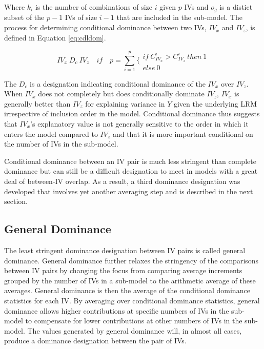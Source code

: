 \documentclass[ShortAfour,times,sageapa]{sagej}
\begin{document}
	Where $k_i$ is the number of combinations of size $i$ given $p$ IVs and $o_g$ is a distict subset of the $p-1$ IVs of size $i - 1$ that are included in the sub-model.	
	The process for determining conditional dominance between two IVs, $IV_x$ and $IV_z$, is defined in Equation \ref{eq:cdldom}.
	
	\begin{equation}
		IV_x \ D_c \ IV_z \quad if \quad p = \sum^p_{i=1} \Biggl\{ \begin{matrix} if \ C^{i}_{IV_x} > C^{i}_{IV_z} \ then \ 1 \\ else \ 0 \end{matrix}
		\label{eq:cdldom}
	\end{equation}
	
	The $D_c$ is a designation indicating conditional dominance of the $IV_x$ over $IV_z$.	
	When $IV_x$ does not completely but does conditionally dominate $IV_z$, $IV_x$ is generally better than $IV_z$ for explaining variance in $Y$ given the underlying LRM irrespective of inclusion order in the model.
	Conditional dominance thus suggests that $IV_x$'s explanatory value is not generally sensitive to the order in which it enters the model compared to $IV_z$ and that it is more important conditional on the number of IVs in the sub-model.
	
	Conditional dominance between an IV pair is much less stringent than complete dominance but can still be a difficult designation to meet in models with a great deal of between-IV overlap.
	As a result, a third dominance designation was developed that involves yet another averaging step and is described in the next section.
	
	\subsection{General Dominance}
	
	The least stringent dominance designation between IV pairs is called general dominance.
	General dominance further relaxes the stringency of the comparisons between IV pairs by changing the focus from comparing average increments grouped by the number of IVs in a sub-model to the arithmetic average of these averages.
	General dominance is then the average of the conditional dominance statistics for each IV.
	By averaging over conditional dominance statistics, general dominance allows higher contributions at specific numbers of IVs in the sub-model to compensate for lower contributions at other numbers of IVs in the sub-model. 
	The values generated by general dominance will, in almost all cases, produce a dominance designation between the pair of IVs.
	
\end{document}
